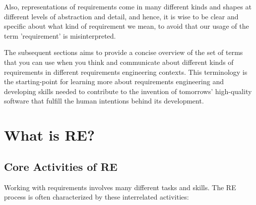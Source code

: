 Also, representations of requirements come in many different kinds and shapes at different levels of abstraction and detail, and hence, it is wise to be clear and specific about what kind of requirement we mean, to avoid that our usage of the term 'requirement' is misinterpreted. 


The subsequent sections aims to provide a concise overview of the set of terms that you can use when you think and communicate about different kinds of requirements in different requirements engineering contexts. This terminology is the starting-point for learning more about requirements engineering and developing skills needed to contribute to the invention of tomorrows' high-quality software that fulfill the human intentions behind its development.

\section{What is RE?}%
\subsection{Core Activities of RE}%
\MarginPage{

}%
Working with requirements involves many different tasks and skills. The RE process is often characterized by these interrelated activities: 

